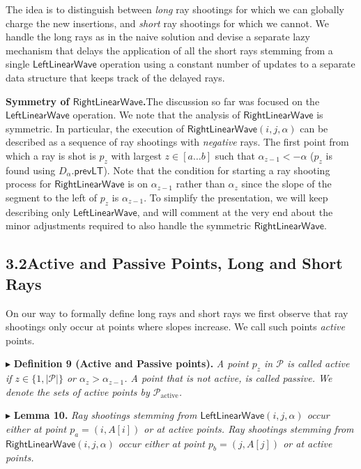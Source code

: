 \documentclass[11pt]{article}
\newcommand{\Pset}{\mathcal{P}}
\newcommand{\Pact}{\mathcal{P}_{\mathrm{active}}}
\newcommand{\Lwave}{\ensuremath{\mathsf{LeftLinearWave}}}
\newcommand{\Rwave}{\ensuremath{\mathsf{RightLinearWave}}}
\newcommand{\prevLT}{\ensuremath{\mathsf{prevLT}}}
\begin{document}
The idea is to distinguish between \emph{long} ray shootings for which we can globally charge
the new insertions, and \emph{short} ray shootings for which we cannot. We handle the long rays as
in the naive solution and devise a separate lazy mechanism that delays the application of all
the short rays stemming from a single \Lwave{} operation using a constant number of
updates to a separate data structure that keeps track of the delayed rays.

\smallskip
\noindent\textbf{Symmetry of \Rwave.}\quad The discussion so far was focused on the \Lwave{}
operation. We note that the analysis of \Rwave{} is symmetric. In particular, the
execution of \Rwave$(i,j,\alpha)$ can be described as a sequence of ray shootings with
\emph{negative} rays. The first point from which a ray is shot is $p_z$ with largest $z \in [a \ldots b]$ such that
$\alpha_{z-1} < -\alpha$ ($p_z$ is found using $D_\alpha.\prevLT$). Note that the condition for starting a ray shooting
process for \Rwave{} is on $\alpha_{z-1}$ rather than $\alpha_z$ since the slope of the segment to the
left of $p_z$ is $\alpha_{z-1}$. To simplify the presentation, we will keep describing only \Lwave,
and will comment at the very end about the minor adjustments required to also handle the
symmetric \Rwave.

\subsection*{3.2\quad Active and Passive Points, Long and Short Rays}

On our way to formally define long rays and short rays we first observe that ray shootings
only occur at points where slopes increase. We call such points \emph{active} points.

\smallskip
$\blacktriangleright$ \textbf{Definition 9 (Active and Passive points).} \emph{A point $p_z$ in $\Pset$ is called active if $z \in \{1, |\Pset|\}$ or
$\alpha_z > \alpha_{z-1}$. A point that is not active, is called passive. We denote the sets of active points
by $\Pact$.}



$\blacktriangleright$ \textbf{Lemma 10.} \emph{Ray shootings stemming from \Lwave$(i,j,\alpha)$ occur either at point
$p_a = (i, A[i])$ or at active points. Ray shootings stemming from \Rwave$(i,j,\alpha)$ occur
either at point $p_b = (j, A[j])$ or at active points.}
\end{document}
